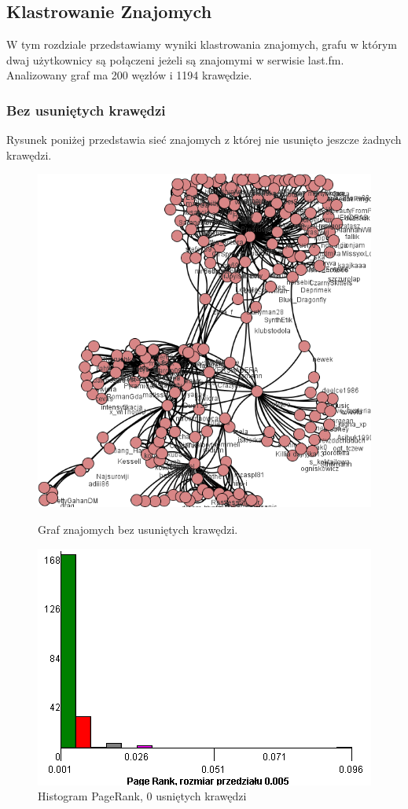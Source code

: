 \documentclass[10pt,a4paper]{article}
\begin{document}
\subsection{Klastrowanie Znajomych}

	W tym rozdziale przedstawiamy wyniki klastrowania znajomych, grafu w którym dwaj użytkownicy są połączeni jeżeli są znajomymi w serwisie last.fm. Analizowany graf ma 200 węzłów i 1194 krawędzie.

\subsubsection{Bez usuniętych krawędzi}
	Rysunek poniżej przedstawia sieć znajomych z której nie usunięto jeszcze żadnych krawędzi.

\begin{figure}[H]
\centering
\caption{Graf znajomych bez usuniętych krawędzi.}
\includegraphics[scale=0.6]{wyniki/final200Friends/0200friends.png}
\label{fig:0200friendsPRHist}
\end{figure}

\begin{figure}[H]
\centering
\caption{Histogram PageRank, 0 usniętych krawędzi}
\includegraphics[scale=0.6]{wyniki/final200Friends/0200friendsPRHist.png}
\end{figure}
\end{document}

